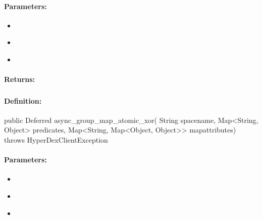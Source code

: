 \paragraph{Parameters:}
\begin{itemize}[noitemsep]
\item {}\\

\item {}\\

\item {}\\

\end{itemize}

\paragraph{Returns:}


\pagebreak
\subsubsection{}
\label{api:java:async_group_map_atomic_xor}


\paragraph{Definition:}
\begin{javacode}
public Deferred async_group_map_atomic_xor(
        String spacename,
        Map<String, Object> predicates,
        Map<String, Map<Object, Object>> mapattributes) throws HyperDexClientException
\end{javacode}

\paragraph{Parameters:}
\begin{itemize}[noitemsep]
\item {}\\

\item {}\\

\item {}\\

\end{itemize}

